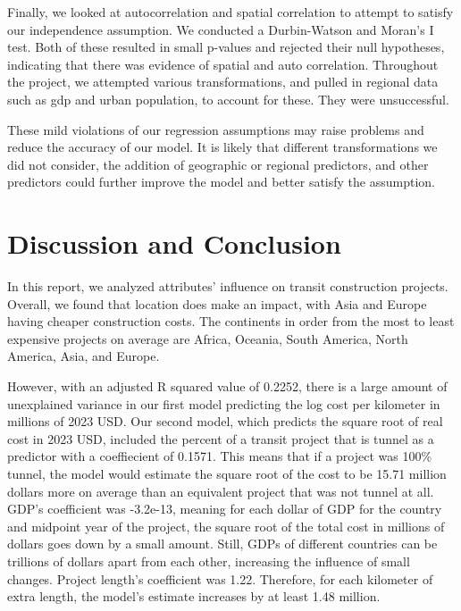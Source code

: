 \documentclass[12pt]{article}
\begin{document}
Finally, we looked at autocorrelation and spatial correlation to attempt to satisfy our independence assumption. We conducted a Durbin-Watson and Moran’s I test. Both of these resulted in small p-values and rejected their null hypotheses, indicating that there was evidence of spatial and auto correlation. Throughout the project, we attempted various transformations, and pulled in regional data such as gdp and urban population, to account for these. They were unsuccessful.

These mild violations of our regression assumptions may raise problems and reduce the accuracy of our model. It is likely that different transformations we did not consider, the addition of geographic or regional predictors, and other predictors could further improve the model and better satisfy the assumption. 


\section{Discussion and Conclusion}

In this report, we analyzed attributes' influence on transit construction projects. Overall, we found that location does make an impact, with Asia and Europe having cheaper construction costs. The continents in order from the most to least expensive projects on average are Africa, Oceania, South America, North America, Asia, and Europe.
 
However, with an adjusted R squared value of 0.2252, there is a large amount of unexplained variance in our first model predicting the log cost per kilometer in millions of 2023 USD. Our second model, which predicts the square root of real cost in 2023 USD, included the percent of a transit project that is tunnel as a predictor with a coeffiecient of 0.1571. This means that if a project was 100\% tunnel, the model would estimate the square root of the cost to be 15.71 million dollars more on average than an equivalent project that was not tunnel at all. GDP’s coefficient was -3.2e-13, meaning for each dollar of GDP for the country and midpoint year of the project, the square root of the total cost in millions of dollars goes down by a small amount. Still, GDPs of different countries can be trillions of dollars apart from each other, increasing the influence of small changes. Project length’s coefficient was 1.22. Therefore, for each kilometer of extra length, the model’s estimate increases by at least 1.48 million.
 
\end{document}
